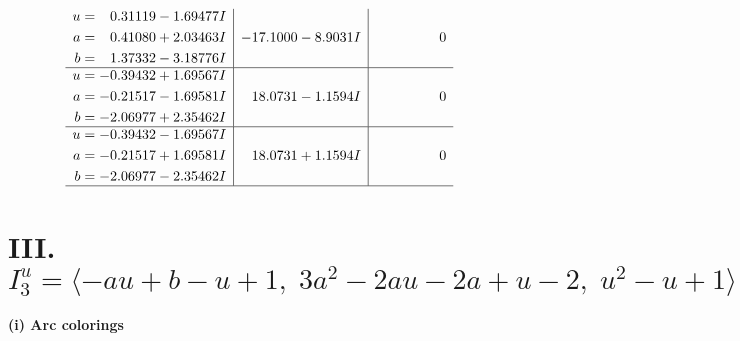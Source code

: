 \documentclass[1p]{elsarticle_modified}
\theoremstyle{definition}
\begin{document}
$$\begin{array}{c|c|c}
\begin{aligned}
u &= \phantom{-}0.31119 - 1.69477 I \\
a &= \phantom{-}0.41080 + 2.03463 I \\
b &= \phantom{-}1.37332 - 3.18776 I\end{aligned}
 & -17.1000 - 8.9031 I & \phantom{-0.000000 } 0 \\ \hline\begin{aligned}
u &= -0.39432 + 1.69567 I \\
a &= -0.21517 - 1.69581 I \\
b &= -2.06977 + 2.35462 I\end{aligned}
 & \phantom{-}18.0731 - 1.1594 I & \phantom{-0.000000 } 0 \\ \hline\begin{aligned}
u &= -0.39432 - 1.69567 I \\
a &= -0.21517 + 1.69581 I \\
b &= -2.06977 - 2.35462 I\end{aligned}
 & \phantom{-}18.0731 + 1.1594 I & \phantom{-0.000000 } 0\\
 \hline 
 \end{array}$$\newpage\newpage\renewcommand{\arraystretch}{1}
\centering \section*{III. $I^u_{3}= \langle - a u+b- u+1,\;3 a^2-2 a u-2 a+u-2,\;u^2- u+1 \rangle$}
\flushleft \textbf{(i) Arc colorings}\\
\end{document}
